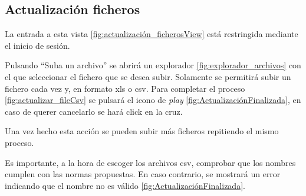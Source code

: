 \subsection{Actualización ficheros} 
La entrada a esta vista \ref{fig:actualización_ficherosView} está restringida mediante el inicio de sesión.    


Pulsando ``Suba un archivo'' se abrirá un explorador \ref{fig:explorador_archivos} con el que seleccionar el fichero que se desea subir. Solamente se permitirá subir un fichero cada vez y, en formato xls o csv. Para completar el proceso \ref{fig:actualizar_fileCsv} se pulsará el icono de \emph{play} \ref{fig:ActualizaciónFinalizada}, en caso de querer cancelarlo se hará click en la cruz.


Una vez hecho esta acción se pueden subir más ficheros repitiendo el mismo proceso. 

Es importante, a la hora de escoger los archivos csv, comprobar que los nombres cumplen con las normas propuestas. En caso contrario, se mostrará un error indicando que el nombre no es válido \ref{fig:ActualizaciónFinalizada}. 

